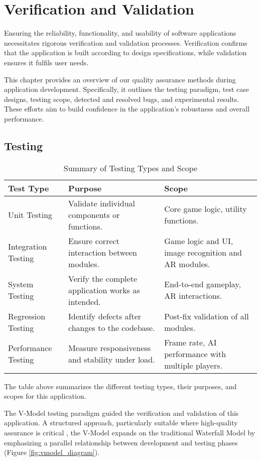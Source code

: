 \chapter{Verification and Validation}
\label{chap:verification-and-validation}

Ensuring the reliability, functionality, and usability of software applications necessitates rigorous verification and validation processes. Verification confirms that the application is built according to design specifications, while validation ensures it fulfils user needs.

This chapter provides an overview of our quality assurance methods during application development. Specifically, it outlines the testing paradigm, test case designs, testing scope, detected and resolved bugs, and experimental results. These efforts aim to build confidence in the application's robustness and overall performance.

\section{Testing}
\begin{table}[ht!]
    \centering
    \begin{tabular}{|p{4cm}|p{4cm}|p{4cm}|}
    \hline
    \textbf{Test Type} & \textbf{Purpose} & \textbf{Scope} \\ \hline
    Unit Testing       & Validate individual components or functions. & Core game logic, utility functions. \\ \hline
    Integration Testing & Ensure correct interaction between modules. & Game logic and UI, image recognition and AR modules. \\ \hline
    System Testing     & Verify the complete application works as intended. & End-to-end gameplay, AR interactions. \\ \hline
    Regression Testing & Identify defects after changes to the codebase. & Post-fix validation of all modules. \\ \hline
    Performance Testing & Measure responsiveness and stability under load. & Frame rate, AI performance with multiple players. \\ \hline
    \end{tabular}
    \caption{Summary of Testing Types and Scope}
    \label{tab:testing_summary}
\end{table}
The table above summarizes the different testing types, their purposes, and scopes for this application.

The V-Model testing paradigm guided the verification and validation of this application. A structured approach, particularly suitable where high-quality assurance is critical \cite{bib:vmodel}, the V-Model expands on the traditional Waterfall Model by emphasizing a parallel relationship between development and testing phases (Figure \ref{fig:vmodel_diagram}). 

